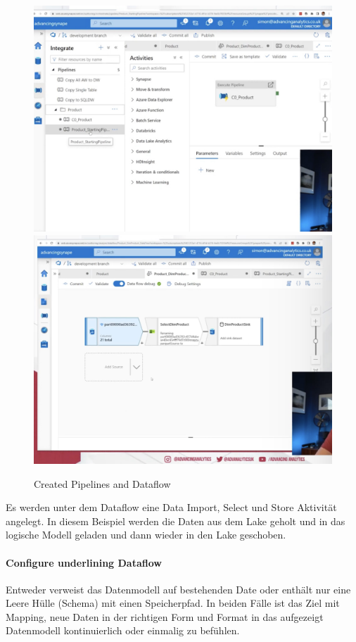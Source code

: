 \begin{figure}[H]
	\centering
	\includegraphics[scale = 0.2]{attachment/chapter_2/Scc146}
	\includegraphics[scale = 0.2]{attachment/chapter_2/Scc147}
	\caption{Created Pipelines and Dataflow}
\end{figure}

Es werden unter dem Dataflow eine Data Import, Select und Store Aktivität angelegt. In diesem Beispiel werden die Daten aus dem Lake geholt und in das logische Modell geladen und dann wieder in den Lake geschoben.

\paragraph{Configure underlining Dataflow}
Entweder verweist das Datenmodell auf bestehenden Date oder enthält nur eine Leere Hülle (Schema) mit einen Speicherpfad. In beiden Fälle ist das Ziel mit Mapping, neue Daten in der richtigen Form und Format in das aufgezeigt Datenmodell kontinuierlich oder einmalig zu befühlen.\\

